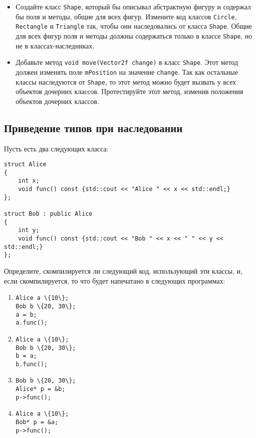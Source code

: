\documentclass{article}
\begin{document}
\begin{itemize}
\item Создайте класс \texttt{Shape}, который бы описывал абстрактную фигуру и содержал бы поля и методы, общие для всех фигур. Измените код классов \texttt{Circle}, \texttt{Rectangle} и \texttt{Triangle} так, чтобы они наследовались от класса \texttt{Shape}. Общие для всех фигур поля и методы должны содержаться только в классе \texttt{Shape}, но не в классах-наследниках.

\item Добавьте метод \texttt{void move(Vector2f change)} в класс \texttt{Shape}. Этот метод должен изменять поле \texttt{mPosition} на значение \texttt{change}. Так как остальные классы наследуются от \texttt{Shape}, то этот метод можно будет вызвать у всех объектов дочерних классов. Протестируйте этот метод, изменив положения объектов дочерних классов.
\end{itemize}


\subsection{Приведение типов при наследовании}
Пусть есть два следующих класса:
\begin{lstlisting}
struct Alice
{
	int x;
	void func() const {std::cout << "Alice " << x << std::endl;}
};

struct Bob : public Alice
{
	int y;
	void func() const {std::cout << "Bob " << x << " " << y << std::endl;}
};
\end{lstlisting}

Определите, скомпилируется ли следующий код, использующий эти классы, и, если скомпилируется, то что будет напечатано в следующих программах:
\begin{enumerate}
\item \begin{Verbatim}[commandchars=\\\{\}]
Alice a \{10\};
Bob b \{20, 30\};
a = b;
a.func();
\end{Verbatim}

\item \begin{Verbatim}[commandchars=\\\{\}]
Alice a \{10\};
Bob b \{20, 30\};
b = a;
b.func();
\end{Verbatim}

\item \begin{Verbatim}[commandchars=\\\{\}]
Bob b \{20, 30\};
Alice* p = &b;
p->func();
\end{Verbatim}

\item \begin{Verbatim}[commandchars=\\\{\}]
Alice a \{10\};
Bob* p = &a;
p->func();
\end{Verbatim}
\end{enumerate}
\end{document}
